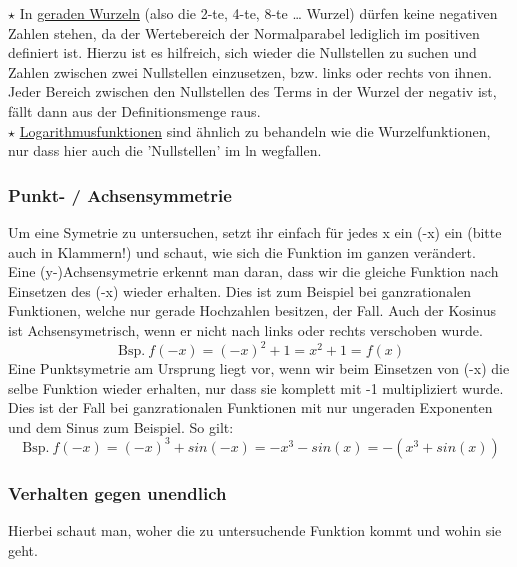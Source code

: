 		\(\star\) In \underline{geraden Wurzeln} (also die 2-te, 4-te, 8-te \ldots
		Wurzel) dürfen keine negativen Zahlen stehen, da der Wertebereich der
		Normalparabel lediglich im positiven definiert ist. Hierzu ist es hilfreich,
		sich wieder die Nullstellen zu suchen und Zahlen zwischen zwei Nullstellen
		einzusetzen, bzw. links oder rechts von ihnen. Jeder Bereich zwischen den
		Nullstellen des Terms in der Wurzel der negativ ist, fällt dann aus der
		Definitionsmenge raus.\\

		\(\star\) \underline{Logarithmusfunktionen} sind ähnlich zu behandeln wie die
		Wurzelfunktionen, nur dass hier auch die 'Nullstellen' im ln wegfallen.

	\subsubsection{Punkt- / Achsensymmetrie}
		Um eine Symetrie zu untersuchen, setzt ihr einfach für jedes x ein (-x) ein
		(bitte auch in Klammern!) und schaut, wie sich die Funktion im ganzen
		verändert.\\
		Eine (y-)Achsensymetrie erkennt man daran, dass wir die gleiche Funktion nach
		Einsetzen des (-x) wieder erhalten. Dies ist zum Beispiel bei ganzrationalen
		Funktionen, welche nur gerade Hochzahlen besitzen, der Fall. Auch der Kosinus
		ist Achsensymetrisch, wenn er nicht nach links oder rechts verschoben wurde.
		\formel{\[f(-x)=f(x),\]}
		\[\mathrm{\ Bsp.\ } f(-x)=(-x)^2+1=x^2+1=f(x)\]
		Eine Punktsymetrie am Ursprung liegt vor, wenn wir beim Einsetzen von (-x) die
		selbe Funktion wieder erhalten, nur dass sie komplett mit -1 multipliziert
		wurde. Dies ist der Fall bei ganzrationalen Funktionen mit nur ungeraden
		Exponenten und dem Sinus zum Beispiel. So gilt:
		\formel{\[f(-x)=-f(x),\]}
		\[\mathrm{\ Bsp.\ }
		f(-x)=(-x)^3+sin(-x)=-x^3-sin(x)=-(x^3+sin(x))\]
		

	\subsubsection{Verhalten gegen unendlich}
		Hierbei schaut man, woher die zu untersuchende Funktion kommt und wohin sie
		geht.\\

